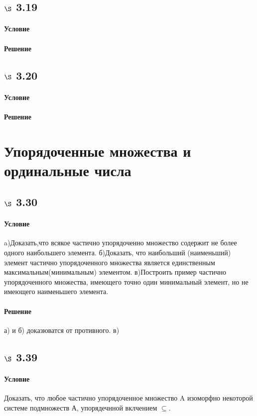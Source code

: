 \documentclass[a4paper,12pt]{article}
\begin{document}
\subsection*{$\S$ 3.19}
\paragraph*{Условие}
\paragraph*{Решение}

\subsection*{$\S$ 3.20}
\paragraph*{Условие}
\paragraph*{Решение}


\section{Упорядоченные множества и ординальные числа}
\subsection*{$\S$ 3.30}
\paragraph*{Условие}
a)Доказать,что всякое частично упорядоченно множество содержит не более одного наибольшего элемента.
б)Доказать, что наибольший (наименьший) элемент частично упорядоченного множества является единственным максимальным(минимальным) элементом.
в)Построить пример частично упорядоченного множества, имеющего точно один минимальный элемент, но не имеющего наименьшего элемента.
\paragraph*{Решение}
а) и б) доказюватся от противного.
в) 
\subsection*{$\S$ 3.39}
\paragraph*{Условие}
Доказать, что любое частично упорядоченное множество A изоморфно некоторой системе подмножеств А, упорядечнной вклчением $ \subseteq $.
\end{document}
